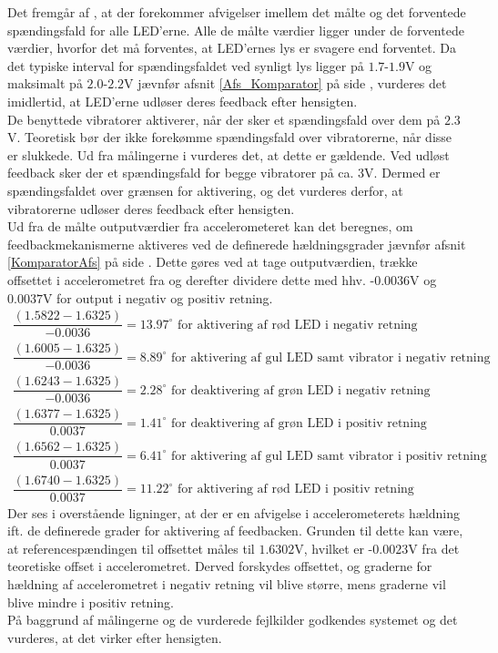 Det fremgår af , at der forekommer afvigelser imellem det målte og det forventede spændingsfald for alle LED'erne. Alle de målte værdier ligger under de forventede værdier, hvorfor det må forventes, at LED'ernes lys er svagere end forventet. Da det typiske interval for spændingsfaldet ved synligt lys ligger på $1.7$-$1.9$V og maksimalt på $2.0$-$2.2$V jævnfør afsnit \ref{Afs_Komparator} på side \pageref{Afs_Komparator}, vurderes det imidlertid, at LED'erne udløser deres feedback efter hensigten.\\
De benyttede vibratorer aktiverer, når der sker et spændingsfald over dem på $2.3$V. \cite{Machinery2009} Teoretisk bør der ikke forekømme spændingsfald over vibratorerne, når disse er slukkede. Ud fra målingerne i  vurderes det, at dette er gældende. Ved udløst feedback sker der et spændingsfald for begge vibratorer på ca. $3$V. Dermed er spændingsfaldet over grænsen for aktivering, og det vurderes derfor, at vibratorerne udløser deres feedback efter hensigten. \\
Ud fra de målte outputværdier fra accelerometeret kan det beregnes, om feedbackmekanismerne aktiveres ved de definerede hældningsgrader jævnfør afsnit \ref{KomparatorAfs} på side \pageref{KomparatorAfs}. Dette gøres ved at tage outputværdien, trække offsettet i accelerometret fra og derefter dividere dette med hhv. -$0.0036$V og $0.0037$V for output i negativ og positiv retning.
\begin{align}
\dfrac{(1.5822 - 1.6325)}{-0.0036} = 13.97^{\circ}\text{ for aktivering af rød LED i negativ retning} \\
\dfrac{(1.6005 - 1.6325)}{-0.0036} = 8.89^{\circ}\text{ for aktivering af gul LED samt vibrator i negativ retning} \\
\dfrac{(1.6243 - 1.6325)}{-0.0036} = 2.28^{\circ}\text{ for deaktivering af grøn LED i negativ retning} \\
\dfrac{(1.6377 - 1.6325)}{0.0037} = 1.41^{\circ}\text{ for deaktivering af grøn LED i positiv retning} \\
\dfrac{(1.6562 - 1.6325)}{0.0037} = 6.41^{\circ}\text{ for aktivering af gul LED samt vibrator i positiv retning} \\
\dfrac{(1.6740 - 1.6325)}{0.0037} = 11.22^{\circ}\text{ for aktivering af rød LED i positiv retning}
\end{align}
\noindent Der ses i overstående ligninger, at der er en afvigelse i accelerometerets hældning ift. de definerede grader for aktivering af feedbacken. Grunden til dette kan være, at referencespændingen til offsettet måles til $1.6302$V, hvilket er -$0.0023$V fra det teoretiske offset i accelerometret. Derved forskydes offsettet, og graderne for hældning af accelerometret i negativ retning vil blive større, mens graderne vil blive mindre i positiv retning.\\
På baggrund af målingerne og de vurderede fejlkilder godkendes systemet og det vurderes, at det virker efter hensigten.\\


